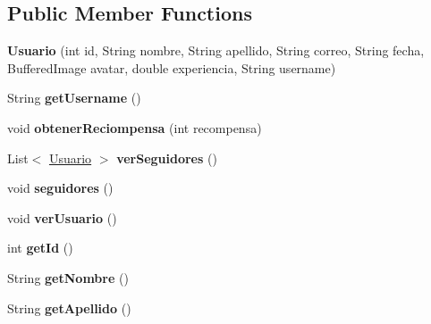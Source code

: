 \subsection*{Public Member Functions}
\begin{DoxyCompactItemize}
\item 
\mbox{\label{classmodelo_1_1_usuario_a6070de92838a506458ccd85e4ba64256}} 
{\bfseries Usuario} (int id, String nombre, String apellido, String correo, String fecha, Buffered\+Image avatar, double experiencia, String username)
\item 
\mbox{\label{classmodelo_1_1_usuario_afd9614ab19dbc8d9a63339ba48003519}} 
String {\bfseries get\+Username} ()
\item 
\mbox{\label{classmodelo_1_1_usuario_a557ba08b1e96354700e86cb2e4a85ebd}} 
void {\bfseries obtener\+Reciompensa} (int recompensa)
\item 
\mbox{\label{classmodelo_1_1_usuario_a4f39aac4804e1990385f747e0286c085}} 
List$<$ \mbox{\hyperlink{classmodelo_1_1_usuario}{Usuario}} $>$ {\bfseries ver\+Seguidores} ()
\item 
\mbox{\label{classmodelo_1_1_usuario_a207d20ba99d17f964133d0b5ff9dd26d}} 
void {\bfseries seguidores} ()
\item 
\mbox{\label{classmodelo_1_1_usuario_acb3327a5d6ca0689910aa78823643f13}} 
void {\bfseries ver\+Usuario} ()
\item 
\mbox{\label{classmodelo_1_1_usuario_a9b718abb70162e2267dac63871339a91}} 
int {\bfseries get\+Id} ()
\item 
\mbox{\label{classmodelo_1_1_usuario_ac0420f9e34ab2d3ca5334444ae7d9ee9}} 
String {\bfseries get\+Nombre} ()
\item 
\mbox{\label{classmodelo_1_1_usuario_a736af6115a71cba37b4a87ae3430994f}} 
String {\bfseries get\+Apellido} ()
\item 
\mbox{\label{classmodelo_1_1_usuario_a846c5ccf22a065fda68b6e69b02c1124}} 

\end{DoxyCompactItemize}
